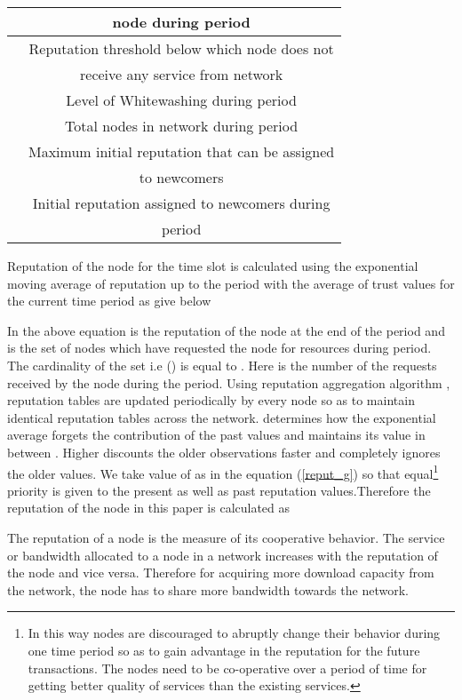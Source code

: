 \documentclass[journal]{IEEEtran}
\begin{document}
\begin{table}[]
\begin{tabular}{ |c|c|}
		&   node  during  period\\
		\hline
		 & Reputation threshold below which node does not \\
		& receive any service from network\\
		\hline
		         & Level of Whitewashing during  period\\
		\hline
		      & Total nodes in network during  period\\
		\hline
		 & Maximum initial reputation that can be assigned \\ 
		& to newcomers\\
		\hline 
		  &  Initial reputation assigned to newcomers during \\
		&  period\\  
		\hline
	\end{tabular}
	\label{rep_tab}
\end{table}       
Reputation of the node  for the  time slot is calculated using the exponential moving average \cite{EMA} of reputation up to the  period with the average of trust values for the current time period as give below

In the above equation  is the reputation of the node  at the end of the  period and  is the set of nodes which have requested the node  for resources during  period. The cardinality of the set  i.e () is equal to . Here  is the number of the requests received by the node  during the  period. Using reputation aggregation algorithm \cite{Gossip_Trust}\cite{DifferentialGossip},  reputation tables are updated periodically by every node so as to maintain identical reputation tables across the network.  determines how the exponential average forgets the contribution of the past values and maintains its value in between . Higher  discounts the older observations faster and  completely ignores the  older values. We take value of  as  in the equation (\ref{reput_g}) so that equal\footnote{In this way nodes are discouraged to abruptly change their behavior during one time period so as to gain advantage in the reputation for the future transactions. The nodes need to be co-operative over a period of time for getting better quality of services than the existing services.} priority is given to the present as well as past reputation values.Therefore the reputation of the node  in this paper is calculated as

The reputation of a node is the measure of its cooperative behavior. The service or bandwidth allocated to a node in a network increases with the reputation of the node and vice versa. Therefore for acquiring more download capacity from the network, the node has to share more bandwidth towards the network. 
\end{document}
